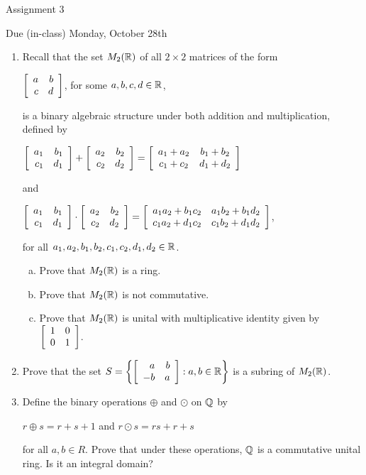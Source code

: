 \documentclass[11pt,fleqn,dvipsnames,usenames]{article}
\renewcommand{\headrulewidth}{1pt}
\begin{document}
\fancyhead[L]{\course}
\fancyhead[R]{\term}
\renewcommand{\headrulewidth}{0.4pt}

\begin{center}
{\huge Assignment 3}
\vsp

{\large Due (in-class) Monday, October 28th}
\end{center}

\begin{enumerate}
\item Recall that the set $M_{2}(\R)$ of all $2\times 2$ matrices of the form
\begin{center}
$\MATRIX{rr}{a & b\\c & d}$, for some $a,b,c,d\in\R$,
\end{center}
is a binary algebraic structure under both addition and multiplication, defined by
\begin{center}
$\MATRIX{rr}{a_1 & b_1\\c_1 & d_1} + \MATRIX{rr}{a_2 & b_2\\c_2 & d_2} = \MATRIX{cc}{a_1 + a_2 & b_1 + b_2\\c_1 + c_2& d_1 + d_2}$
\end{center}
and
\begin{center}
$\MATRIX{rr}{a_1 & b_1\\c_1 & d_1}\cdot \MATRIX{rr}{a_2 & b_2\\c_2 & d_2} = \MATRIX{cc}{a_1a_2 + b_1c_2 & a_1b_2 + b_1d_2\\c_1a_2 + d_1c_2 & c_1b_2 + d_1d_2}$,
\end{center}
for all $a_{1},a_{2},b_{1},b_{2},c_{1},c_{2},d_{1},d_{2}\in\R$.
\vsp
\begin{enumerate}[(a)]
\item Prove that $M_{2}(\R)$ is a ring.
\item Prove that $M_{2}(\R)$ is not commutative.
\item Prove that $M_{2}(\R)$ is unital with multiplicative identity given by $\MATRIX{rr}{1 & 0\\0 & 1}$.
\end{enumerate}

\item Prove that the set $S = \SET{\MATRIX{rr}{a & b\\-b & a}:a,b\in\R}$ is a subring of $M_{2}(\R)$.
\item Define the binary operations $\oplus$ and $\odot$ on $\Q$ by
\begin{center}
$r\oplus s = r + s + 1$ and $r\odot s = rs + r + s$
\end{center}
for all $a,b\in R$.  Prove that under these operations, $\Q$ is a commutative unital ring.  Is it an integral domain?


\end{enumerate}
\end{document}
